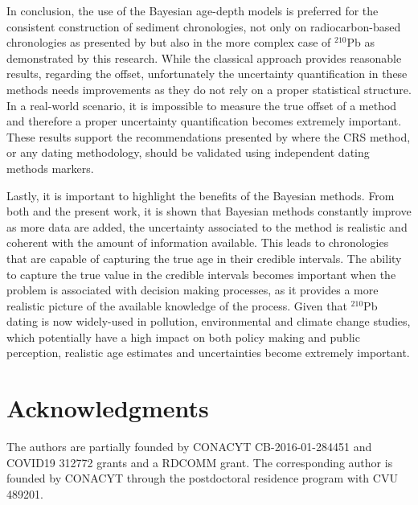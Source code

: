 \documentclass [10pt] {article}
\begin{document}
In conclusion, the use of the Bayesian age-depth models is preferred for the consistent construction of sediment chronologies, not only on radiocarbon-based chronologies as presented by \citet{Blaauw2018} but also in the more complex case of $^{210}$Pb as demonstrated by this research.
While the classical approach provides reasonable results, regarding the offset, unfortunately the uncertainty quantification in these methods needs improvements as they do not rely on a proper statistical structure. 
In a real-world scenario, it is impossible to measure the true offset of a method and therefore a proper uncertainty quantification becomes extremely important.
These results support the recommendations presented by \citet{Smith2001,Barsanti2020} where the CRS method, or any dating methodology, should be validated using independent dating methods markers. 

Lastly, it is important to highlight the benefits of the Bayesian methods.
From both \citet{Blaauw2018} and the present work, it is shown that Bayesian methods constantly improve as more data are added, the uncertainty associated to the method is realistic and coherent with the amount of information available. This leads to chronologies that are capable of capturing the true age in their credible intervals. 
The ability to capture the true value in the credible intervals becomes important when the problem is associated with decision making processes, as it provides a more realistic picture of the available knowledge of the process. 
Given that $^{210}$Pb dating is now widely-used in pollution, environmental and climate change studies, which potentially have a high impact on both policy making and public perception, realistic age estimates and uncertainties become extremely important. 



\section{Acknowledgments}

The authors are partially founded by CONACYT CB-2016-01-284451 and COVID19 312772 grants and a RDCOMM grant.
The corresponding author is founded by CONACYT through the postdoctoral residence program with CVU  489201.




\newpage
\end{document}
